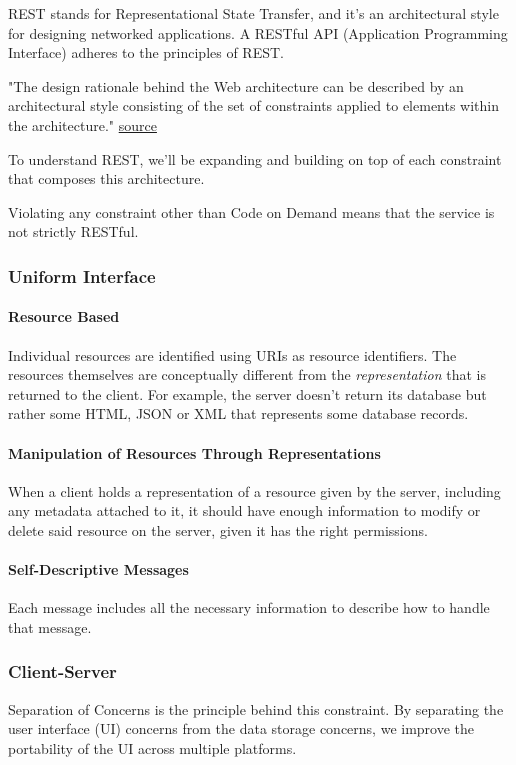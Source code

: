 \documentclass[a4paper]{article}
\begin{document}
    REST stands for Representational State Transfer, and it's an architectural style for designing networked applications. A RESTful API (Application Programming Interface) adheres to the principles of REST.


    "The design rationale behind the Web architecture can be described by an architectural style consisting of the set of constraints applied to elements within the architecture." \href{https://ics.uci.edu/~fielding/pubs/dissertation/rest_arch_style.htm}{source}

    To understand REST, we'll be expanding and building on top of each constraint that composes this architecture.

    Violating any constraint other than Code on Demand means that the service is not strictly RESTful.

    
    \subsubsection{Uniform Interface}
    \paragraph{Resource Based}
    Individual resources are identified using URIs as resource identifiers. The resources themselves are conceptually different from the \textit{representation} that is returned to the client. For example, the server doesn't return its database but rather some HTML, JSON or XML that represents some database records.

    \paragraph{Manipulation of Resources Through Representations} When a client holds a representation of a resource given by the server, including any metadata attached to it, it should have enough information to modify or delete said resource on the server, given it has the right permissions. 

    \paragraph{Self-Descriptive Messages} Each message includes all the necessary information to describe how to handle that message. 

    
    \subsubsection{Client-Server} Separation of Concerns is the principle behind this constraint. By separating the user interface (UI) concerns from the data storage concerns, we improve the portability of the UI across multiple platforms.
    
\end{document}
